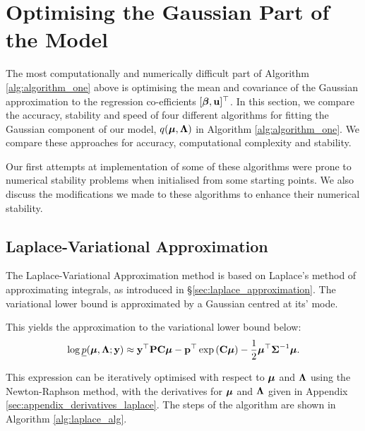 \section{Optimising the Gaussian Part of the Model}
	\label{sec:gaussian}

	The most computationally and numerically difficult part of Algorithm \ref{alg:algorithm_one} above is
	optimising the mean and covariance of the Gaussian approximation to the regression co-efficients $[{\boldsymbol \beta},
	{\bf u}]^\top$. In this section, we compare the accuracy, stability and speed of four different algorithms for
	fitting the Gaussian component of our model, $q({\boldsymbol \mu}, {\boldsymbol \Lambda})$ in Algorithm \ref{alg:algorithm_one}.  We
	compare these approaches for accuracy, computational complexity and stability.

	Our first attempts at implementation of some of these algorithms were prone to numerical stability problems
	when initialised from some starting points. We also discuss the modifications we made to these algorithms to
	enhance their numerical stability.
		
	\subsection{Laplace-Variational Approximation}
	The Laplace-Variational Approximation method is based on Laplace's method of approximating integrals, as
	introduced in \S \ref{sec:laplace_approximation}. The variational lower bound  is approximated by a Gaussian
	centred at its' mode.

	This yields the approximation to the variational lower bound below:
	\begin{align*}
		\log \underline{p}({\boldsymbol \mu}, {\boldsymbol \Lambda}; {\bf y}) \approx {\bf y}^\top{\bf P}{\bf C}{\boldsymbol\mu} - {\bf p}^\top\exp \left ({\bf C} {\boldsymbol \mu} \right ) - \frac{1}{2} {\boldsymbol \mu}^\top {\boldsymbol\Sigma}^{-1} {\boldsymbol \mu}. 
	\end{align*}
			
	\noindent This expression can be iteratively optimised with respect to ${\boldsymbol \mu}$ and ${\boldsymbol \Lambda}$ using the
	Newton-Raphson method, with the derivatives for ${\boldsymbol \mu}$ and ${\boldsymbol \Lambda}$ given in Appendix
	\ref{sec:appendix_derivatives_laplace}. The steps of the algorithm are shown in Algorithm \ref{alg:laplace_alg}.
			

